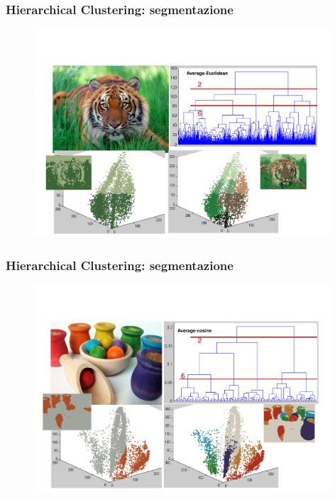 \begin{frame}

	\frametitle{{\color{GradientDescentDiagramGreen}Hierarchical Clustering}: segmentazione}

		\begin{figure}[!htbp]
			\centering
			\includegraphics[width=11.0cm]{images/unsupervised/hierarchical/hc_avg_euclidean_1.pdf}
		\end{figure}


\end{frame}


\begin{frame}

	\frametitle{{\color{GradientDescentDiagramGreen}Hierarchical Clustering}: segmentazione}

		\begin{figure}[!htbp]
			\centering
			\includegraphics[width=11.0cm]{images/unsupervised/hierarchical/hc_avg_cosine_2.pdf}
		\end{figure}


\end{frame}


